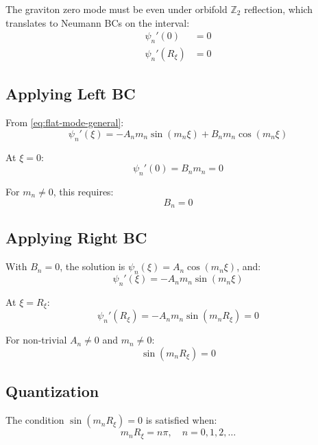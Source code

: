 \documentclass[11pt,a4paper]{article}
\newcommand{\Rxi}{R_\xi}
\begin{document}
The graviton zero mode must be even under orbifold $\mathbb{Z}_2$ reflection,
which translates to Neumann BCs on the interval:
\begin{align}
\psi_n'(0) &= 0 \label{eq:BC-left}\\
\psi_n'(\Rxi) &= 0 \label{eq:BC-right}
\end{align}

\subsection{Applying Left BC}

From \eqref{eq:flat-mode-general}:
\begin{equation}
\psi_n'(\xi) = -A_n m_n \sin(m_n \xi) + B_n m_n \cos(m_n \xi)
\label{eq:mode-derivative}
\end{equation}

At $\xi = 0$:
\begin{equation}
\psi_n'(0) = B_n m_n = 0
\label{eq:BC-left-applied}
\end{equation}

For $m_n \neq 0$, this requires:
\begin{equation}
B_n = 0
\label{eq:Bn-zero}
\end{equation}

\subsection{Applying Right BC}

With $B_n = 0$, the solution is $\psi_n(\xi) = A_n \cos(m_n \xi)$, and:
\begin{equation}
\psi_n'(\xi) = -A_n m_n \sin(m_n \xi)
\label{eq:mode-derivative-simplified}
\end{equation}

At $\xi = \Rxi$:
\begin{equation}
\psi_n'(\Rxi) = -A_n m_n \sin(m_n \Rxi) = 0
\label{eq:BC-right-applied}
\end{equation}

For non-trivial $A_n \neq 0$ and $m_n \neq 0$:
\begin{equation}
\sin(m_n \Rxi) = 0
\label{eq:quantization-condition}
\end{equation}

\subsection{Quantization}

The condition $\sin(m_n \Rxi) = 0$ is satisfied when:
\begin{equation}
m_n \Rxi = n\pi, \quad n = 0, 1, 2, \ldots
\label{eq:quantization-result}
\end{equation}
\end{document}
